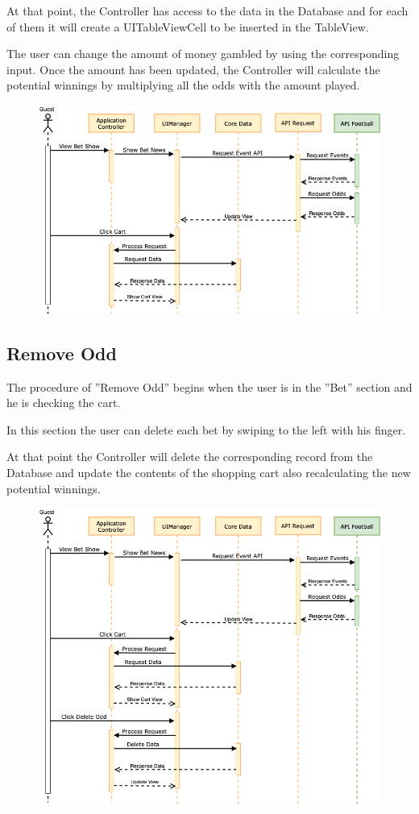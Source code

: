 \documentclass[numbers=noenddot, 12pt, a4paper, oneside]{scrbook}
\begin{document}
At  that point, the Controller has access to the data in the Database and for each of them  it will create a UITableViewCell to be inserted in the TableView.

The user can change the amount of money gambled  by using the corresponding  input.  Once the amount has been updated, the Controller will calculate the potential winnings by multiplying all the odds with the amount played.

\begin{figure}[H]
	\centering
	\includegraphics[width=1\textwidth]{images/Sequence/SequenceViewCart}
\end{figure}
\newpage
\subsection*{Remove Odd}
The procedure of  ”Remove Odd” begins when the user is in the ”Bet” section and he is checking the cart.

In this section the user can delete each bet by swiping to the left with his finger.

At that point the Controller will delete the corresponding record from the Database and update the contents of the shopping cart also recalculating the new potential winnings.
\begin{figure}[H]
	\centering
	\includegraphics[width=1\textwidth]{images/Sequence/SequenceRemoveOdd}
\end{figure}
\end{document}
